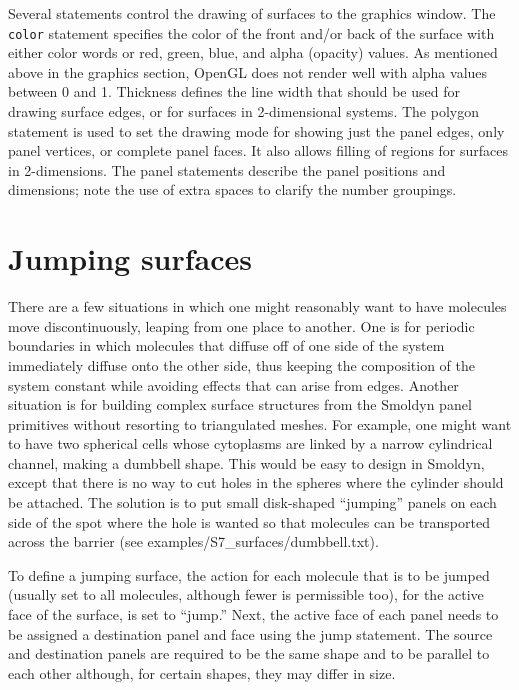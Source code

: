 \documentclass {scrbook}
\newcommand {\ttt} {\texttt}
\begin{document}
Several statements control the drawing of surfaces to the graphics window. The \ttt{color} statement specifies the color of the front and/or back of the surface with either color words or red, green, blue, and alpha (opacity) values. As mentioned above in the graphics section, OpenGL does not render well with alpha values between 0 and 1. Thickness defines the line width that should be used for drawing surface edges, or for surfaces in 2-dimensional systems. The polygon statement is used to set the drawing mode for showing just the panel edges, only panel vertices, or complete panel faces. It also allows filling of regions for surfaces in 2-dimensions. The panel statements describe the panel positions and dimensions; note the use of extra spaces to clarify the number groupings.

\section{Jumping surfaces}

There are a few situations in which one might reasonably want to have molecules move discontinuously, leaping from one place to another. One is for periodic boundaries in which molecules that diffuse off of one side of the system immediately diffuse onto the other side, thus keeping the composition of the system constant while avoiding effects that can arise from edges. Another situation is for building complex surface structures from the Smoldyn panel primitives without resorting to triangulated meshes. For example, one might want to have two spherical cells whose cytoplasms are linked by a narrow cylindrical channel, making a dumbbell shape. This would be easy to design in Smoldyn, except that there is no way to cut holes in the spheres where the cylinder should be attached. The solution is to put small disk-shaped ``jumping'' panels on each side of the spot where the hole is wanted so that molecules can be transported across the barrier (see examples/S7\_surfaces/dumbbell.txt).

To define a jumping surface, the action for each molecule that is to be jumped (usually set to all molecules, although fewer is permissible too), for the active face of the surface, is set to ``jump.'' Next, the active face of each panel needs to be assigned a destination panel and face using the jump statement. The source and destination panels are required to be the same shape and to be parallel to each other although, for certain shapes, they may differ in size.
\end{document}
